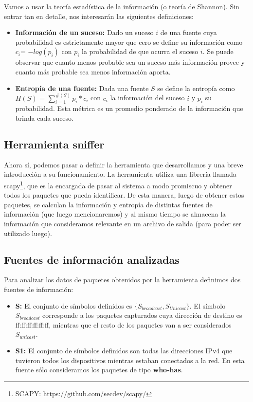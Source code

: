 \par Vamos a usar la teoría estadística de la información (o teoría de Shannon). Sin entrar tan en detalle, nos interesarán las siguientes definiciones:

\begin{itemize}
  \item \textbf{Información de un suceso:} Dado un suceso $i$ de una fuente cuya probabilidad es estrictamente mayor que cero se define su información como $c_i $= $-log(p_i)$ con $p_i$ la probabilidad de que ocurra el suceso $i$. Se puede observar que cuanto menos probable sea un suceso más información provee y cuanto más probable sea menos información aporta.
  \item \textbf{Entropía de una fuente:} Dada una fuente $S$ se define la entropía como $H(S)$ = $\sum_{i=1}^{\#(S)} p_i*c_i$ con $c_i$ la información del suceso $i$ y $p_i$ su probabilidad. Esta m\'etrica es un promedio ponderado de la información que brinda cada suceso.
\end{itemize}

\subsection{Herramienta sniffer}
\par Ahora sí, podemos pasar a definir la herramienta que desarrollamos y una breve introducción a su funcionamiento. La herramienta utiliza una librería llamada scapy\footnote{SCAPY: https://github.com/secdev/scapy/}, que es la encargada de pasar al sistema a modo promiscuo y obtener todos los paquetes que pueda identificar. De esta manera, luego de obtener estos paquetes, se calculan la información y entropía de distintas fuentes de información (que luego mencionaremos) y al mismo tiempo se almacena la información que consideramos relevante en un archivo de salida (para poder ser utilizado luego).

\subsection{Fuentes de información analizadas}
\par Para analizar los datos de paquetes obtenidos por la herramienta definimos dos fuentes de información:
\begin{itemize}
  \item \textbf{S:} El conjunto de símbolos definidos es $\{S_{broadcast},S_{Unicast}\}$. El símbolo $S_{broadcast}$ corresponde a los paquetes capturados cuya dirección de destino es ff:ff:ff:ff:ff:ff, mientras que el resto de los paquetes van a ser considerados $S_{unicast}$.
  \item \textbf{S1:} El conjunto de símbolos definidos son todas las direcciones IPv4 que tuvieron todos los dispositivos mientras estaban conectados a la red. En esta fuente sólo consideramos los paquetes de tipo \textbf{who-has}.
\end{itemize}
